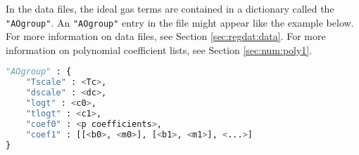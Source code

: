 In the data files, the ideal gas terms are contained in a dictionary called the \texttt{"AOgroup"}.  An \texttt{"AOgroup"} entry in the file might appear like the example below.  For more information on data files, see Section \ref{sec:regdat:data}.  For more information on polynomial coefficient lists, see Section \ref{sec:num:poly1}.

\begin{lstlisting}[language=Python]
"AOgroup" : {
    "Tscale" : <Tc>,
    "dscale" : <dc>,
    "logt" : <c0>,
    "tlogt" : <c1>,
    "coef0" : <p coefficients>,
    "coef1" : [[<b0>, <m0>], [<b1>, <m1>], <...>]
}
\end{lstlisting}

